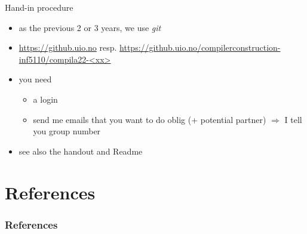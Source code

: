 \documentclass{beamer}
\begin{document}
\begin{frame}[label={sec:orgb5a653a}]{Hand-in procedure}
\begin{itemize}
\item as the previous 2 or 3 years, we use  \emph{git}

\item \url{https://github.uio.no} resp. \href{https://github.uio.no/compilerconstruction-inf5110/compila}{https://github.uio.no/compilerconstruction-inf5110/compila22-<xx>}

\item you need

\begin{itemize}
\item a login
\item send me emails that you want to do oblig (+ potential partner)
\(\Rightarrow\) I tell you group number
\end{itemize}
\end{itemize}


\begin{itemize}
\item see also the \alert{handout} and \alert{Readme}
\end{itemize}
\end{frame}



\section{References}
\label{sec:org39166e7}

\begin{frame}[allowframebreaks]
  \frametitle{References}
  {\tiny
    
%     
  }
\end{frame}




\end{document}
